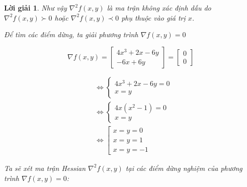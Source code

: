 \documentclass[14pt, a4paper]{article}
\theoremstyle{sltheorem}
\theoremstyle{soltheorem}
\newtheorem*{loigiai}{Lời giải}
\begin{document}
\begin{loigiai}
        Như vậy $\nabla^2 f(x,y)$ là ma trận không xác định dấu do $\nabla^2 f(x,y) \succ 0$ hoặc $\nabla^2 f(x,y) \prec 0$ phụ thuộc vào giá trị $x$.
        
        Để tìm các điểm dừng, ta giải phương trình $\nabla f(x, y) = 0$

        \begin{equation*}
            \nabla f(x, y) = \begin{bmatrix} 4x^3 + 2x - 6y \\ -6x + 6y \end{bmatrix} = \begin{bmatrix} 0 \\ 0 \end{bmatrix}
        \end{equation*}

        \begin{equation}
            \begin{aligned}
            &\Leftrightarrow \begin{cases} 4x^3 + 2x - 6y = 0 \\ x = y \end{cases} \\
            &\Leftrightarrow \begin{cases} 4x(x^2-1) = 0 \\ x = y \end{cases} \\
            &\Leftrightarrow \left [\begin{array}{l} x=y=0 \\ x=y=1 \\ x=y=-1 \end{array}\right.
            \end{aligned}
        \end{equation}

        Ta sẽ xét ma trận Hessian $\nabla^2 f(x,y)$ tại các điểm dừng nghiệm của phương trình $\nabla f(x, y) = 0$:


\end{loigiai}
\end{document}
